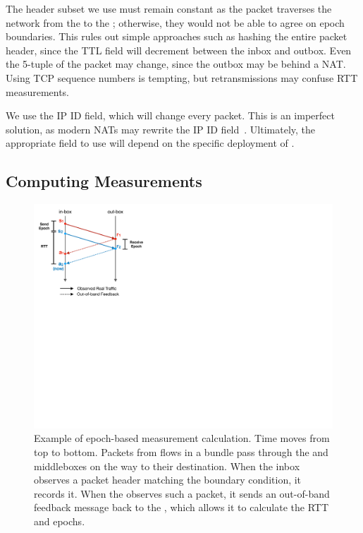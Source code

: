  The header subset we use must remain constant as the packet traverses the network from the \inbox to the \outbox; otherwise, they would not be able to agree on epoch boundaries. This rules out simple approaches such as hashing the entire packet header, since the TTL field will decrement between the inbox and outbox.
Even the 5-tuple of the packet may change, since the outbox may be behind a NAT.
Using TCP sequence numbers is tempting, but retransmissions may confuse RTT measurements.

We use the IP ID field, which will change every packet. This is an imperfect solution, as modern NATs may rewrite the IP ID field~\cite{ipid}.
Ultimately, the appropriate field to use will depend on the specific deployment of \name. 

\subsection{Computing Measurements}
\label{s:measure:compute}
\newcommand{\pone}{$p_{prev}$}
\newcommand{\hpone}{$h(p_{prev})$}
\newcommand{\sone}{$s_{prev}$}
\newcommand{\rone}{$r_{prev}$}
\newcommand{\ptwo}{$p_{curr}$}
\newcommand{\hptwo}{$h(p_{curr})$}
\newcommand{\stwo}{$s_{curr}$}
\newcommand{\rtwo}{$r_{curr}$}
\newcommand{\atwo}{$a_{curr}$}
\newcommand{\sentone}{$sent_{prev}$}
\newcommand{\recvdone}{$rcvd_{prev}$}
\newcommand{\senttwo}{$sent_{curr}$}
\newcommand{\recvdtwo}{$rcvd_{curr}$}


\begin{figure}
    \centering
    \includegraphics[width=\columnwidth]{img/rate-calculation}
    \caption{Example of epoch-based measurement calculation. Time moves from top to bottom.
    Packets from flows in a bundle
    pass through the \inbox and \outbox middleboxes on the way to their destination. When 
    the inbox observes a packet header matching the boundary condition, it records it. When
    the \outbox observes such a packet, it sends an out-of-band feedback message back to
    the \inbox, which allows it to calculate the RTT and epochs.}\label{fig:ratecalc}
\end{figure}

